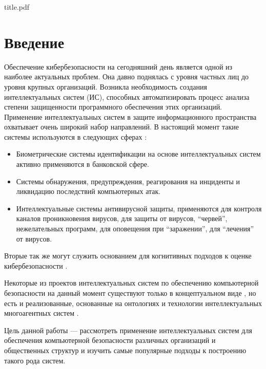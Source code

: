 

\def\oldbibitem{}
\let\oldbibitem=\bibitem
\def\bibitem{\stepcounter{citenum}\oldbibitem}



{title.pdf}

\tableofcontents
\newpage

\section{Введение}
Обеспечение кибербезопасности на сегодняшний день является одной из наиболее актуальных проблем.
Она давно поднялась с уровня частных лиц до уровня крупных организаций. Возникла необходимость
создания интеллектуальных систем (ИС), способных автоматизировать процесс анализа степени защищенности
программного обеспечения этих организаций. Применение интеллектуальных систем в защите
информационного пространства охватывает очень широкий набор направлений.
В настоящий момент такие системы используются в следующих сферах \cite{spheres}:

\begin{itemize}
\item
Биометрические системы идентификации на основе интеллектуальных
систем активно применяются в банковской сфере.
\item
Системы обнаружения,
предупреждения, реагирования на инциденты и ликвидацию последствий компьютерных атак.
\item
Интеллектуальные системы антивирусной защиты, применяются для контроля каналов проникновения вирусов,
для защиты от вирусов, ``червей'', нежелательных программ, для оповещения при ``заражении'', для ``лечения''
от вирусов.
\end{itemize}

Вторые так же могут служить основанием для когнитивных подходов к оценке кибербезопасности \cite{kognmodels}.

Некоторые из проектов интеллектуальных систем по обеспечению компьютерной безопасности
на данный момент существуют только в концептуальном виде \cite{concept}, но есть и реализованные,
основанные на онтологиях и технологии интеллектуальных многоагентных систем \cite{multigent}.

Цель данной работы --- рассмотреть применение интеллектуальных систем для обеспечения компьютерной
безопасности различных организаций и общественных структур и изучить самые популярные подходы
к построению такого рода систем.


